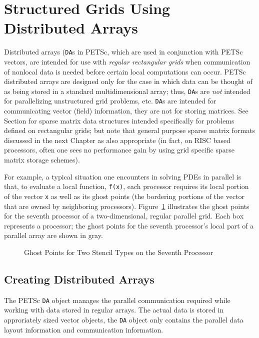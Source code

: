 \section{Structured Grids Using Distributed Arrays}
\label{sec:da} \label{sec:struct}

  Distributed arrays ({\tt DA}s in PETSc, which are used in
conjunction with PETSc vectors, are intended for use with {\em
regular rectangular grids} when communication of nonlocal data is
needed before certain local computations can occur.  PETSc distributed
arrays are designed only for the case in which data can be thought of
as being stored in a standard multidimensional array; thus, {\tt DA}s 
are {\em not} intended for parallelizing unstructured grid problems, etc.
{\tt DA}s are intended for communicating vector (field) information, they 
are not for storing matrices. See Section \cite{sec:bdiag} for sparse matrix
data structures intended specifically for problems defined on rectangular 
grids; but note that general purpose sparse matrix formats discussed in 
the next Chapter as also appropriate (in fact, on RISC based processors,
often one sees no performance gain by using grid specific sparse matrix
storage schemes).

For example, a typical situation one encounters in solving 
PDEs in parallel is that, to evaluate a local function, {\tt f(x)}, each processor
requires its local portion of the vector {\tt x} as well as its ghost
points  (the bordering portions of the vector
that are owned by neighboring processors).  Figure~\ref{fig:ghosts}
illustrates the ghost points for the seventh processor of a
two-dimensional, regular parallel grid.  Each box represents a
processor; the ghost points for the seventh processor's local part of
a parallel array are shown in gray.

\begin{figure}[tb]
\centerline{}
\caption{Ghost Points for Two Stencil Types on the Seventh Processor}
\label{fig:ghosts}
\end{figure}

\subsection{Creating Distributed Arrays}

The PETSc {\tt DA} object manages the parallel communication required
while working with data stored in regular arrays. The actual data
is stored in approriately sized vector objects, the {\tt DA} object 
only contains the parallel data layout information and communication
information. 

